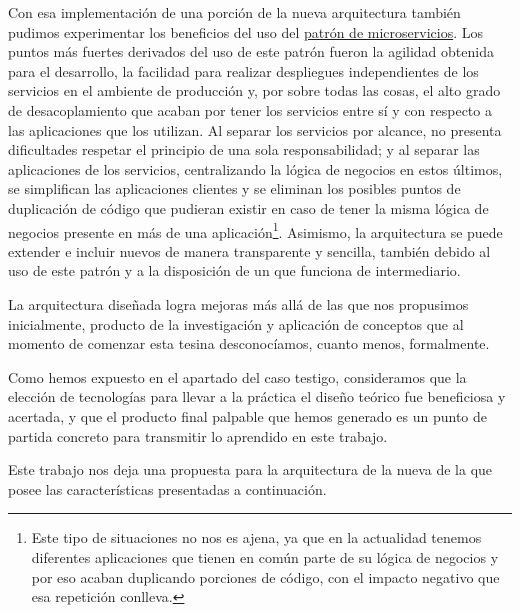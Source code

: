 Con esa implementación de una porción de la nueva arquitectura también pudimos experimentar los beneficios del uso del \hyperref[microservicios]{patrón de microservicios}\cite[p.~27]{richards2015}. Los puntos más fuertes derivados del uso de este patrón fueron la agilidad obtenida para el desarrollo, la facilidad para realizar despliegues independientes de los servicios en el ambiente de producción y, por sobre todas las cosas, el alto grado de desacoplamiento que acaban por tener los servicios entre sí y con respecto a las aplicaciones que los utilizan. Al separar los servicios por alcance, no presenta dificultades respetar el principio de una sola responsabilidad; y al separar las aplicaciones de los servicios, centralizando la lógica de negocios en estos últimos, se simplifican las aplicaciones clientes y se eliminan los posibles puntos de duplicación de código que pudieran existir en caso de tener la misma lógica de negocios presente en más de una aplicación\footnote{Este tipo de situaciones no nos es ajena, ya que en la actualidad tenemos diferentes aplicaciones que tienen en común parte de su lógica de negocios y por eso acaban duplicando porciones de código, con el impacto negativo que esa repetición conlleva.}. Asimismo, la arquitectura se puede extender e incluir nuevos  de manera transparente y sencilla, también debido al uso de este patrón y a la disposición de un  que funciona de intermediario.

La arquitectura diseñada logra mejoras más allá de las que nos propusimos inicialmente, producto de la investigación y aplicación de conceptos que al momento de comenzar esta tesina desconocíamos, cuanto menos, formalmente.

Como hemos expuesto en el apartado \textit{} del caso testigo, consideramos que la elección de tecnologías para llevar a la práctica el diseño teórico fue beneficiosa y acertada, y que el producto final palpable que hemos generado es un punto de partida concreto para transmitir lo aprendido en este trabajo.

Este trabajo nos deja una propuesta para la arquitectura de la nueva {\cloud} de la {\unlp} que posee las características presentadas a continuación.

